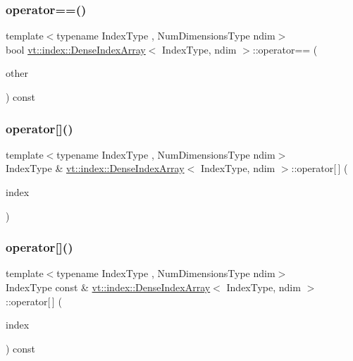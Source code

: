 \subsubsection{\texorpdfstring{operator==()}{operator==()}}
{\footnotesize\ttfamily template$<$typename Index\+Type , Num\+Dimensions\+Type ndim$>$ \\
bool \hyperlink{structvt_1_1index_1_1_dense_index_array}{vt\+::index\+::\+Dense\+Index\+Array}$<$ Index\+Type, ndim $>$\+::operator== (\begin{DoxyParamCaption}\item[{\hyperlink{structvt_1_1index_1_1_dense_index_array_aec95c4ed1b4071d31d24142f02429dbd}{Dense\+Index\+Array\+Type} const \&}]{other }\end{DoxyParamCaption}) const}

\mbox{\label{structvt_1_1index_1_1_dense_index_array_ab157c3c1d228b385f2c7be5f78634d93}} 
\subsubsection{\texorpdfstring{operator[]()}{operator[]()}\hspace{0.1cm}{\footnotesize\ttfamily [1/2]}}
{\footnotesize\ttfamily template$<$typename Index\+Type , Num\+Dimensions\+Type ndim$>$ \\
Index\+Type \& \hyperlink{structvt_1_1index_1_1_dense_index_array}{vt\+::index\+::\+Dense\+Index\+Array}$<$ Index\+Type, ndim $>$\+::operator\mbox{[}$\,$\mbox{]} (\begin{DoxyParamCaption}\item[{Index\+Type const \&}]{index }\end{DoxyParamCaption})}

\mbox{\label{structvt_1_1index_1_1_dense_index_array_ac46f5310e8a39ad248ab55b71d60eac0}} 
\subsubsection{\texorpdfstring{operator[]()}{operator[]()}\hspace{0.1cm}{\footnotesize\ttfamily [2/2]}}
{\footnotesize\ttfamily template$<$typename Index\+Type , Num\+Dimensions\+Type ndim$>$ \\
Index\+Type const  \& \hyperlink{structvt_1_1index_1_1_dense_index_array}{vt\+::index\+::\+Dense\+Index\+Array}$<$ Index\+Type, ndim $>$\+::operator\mbox{[}$\,$\mbox{]} (\begin{DoxyParamCaption}\item[{Index\+Type const \&}]{index }\end{DoxyParamCaption}) const}

